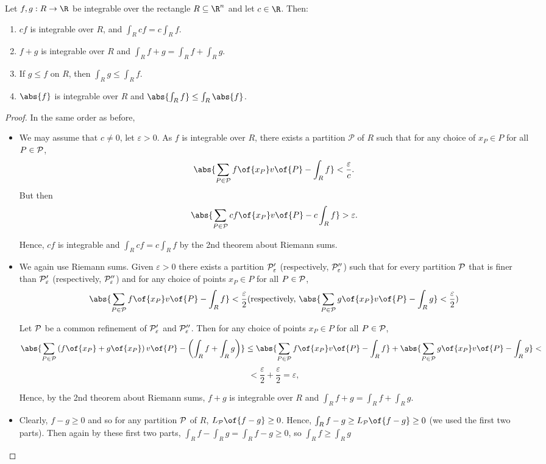 \begin{theorem}[*1]
    Let $f,g: R \to \R$ be integrable over the rectangle $R \subseteq \R^n$ and let $c \in \R$. Then:
    \begin{enumerate}
        \item $cf$ is integrable over $R$, and $\int_R cf = c\int_R f$.
        \item $f + g$ is integrable over $R$ and $\int_R f + g = \int_R f + \int_R g$.
        \item If $g \leq f$ on $R$, then $\int_R g \leq \int_R f$.
        \item $\abs{f}$ is integrable over $R$ and $\abs{\int_R f} \leq \int_R \abs{f}$.
    \end{enumerate}
\end{theorem}
\begin{proof}
    In the same order as before,
    \begin{itemize}
        \item We may assume that $c \neq 0$, let $\varepsilon > 0$. As $f$ is integrable over $R$, there exists a partition $\mathcal{P}$ of $R$ such that for any choice of $x_P \in P$ for all $P \in \cal{P}$, \[\abs{\sum_{P \in \cal{P}} f\of{x_P} v\of{P} - \int_R f} < \frac{\varepsilon}{c}.\] But then \[\abs{\sum_{P \in \cal{P}} cf\of{x_P} v\of{P} - c\int_R f} > \varepsilon.\]
        
        Hence, $cf$ is integrable and $\int_R cf = c\int_R f$ by the 2nd theorem about Riemann sums.

        \item We again use Riemann sums. Given $\varepsilon > 0$ there exists a partition $\cal{P}_\varepsilon'$ (respectively, $\cal{P}_\varepsilon''$) such that for every partition $\cal{P}$ that is finer than $\cal{P}_\varepsilon'$ (respectively, $\cal{P}_\varepsilon''$) and for any choice of points $x_P \in P$ for all $P \in \cal{P}$,
        \[\abs{\sum_{P \in \cal{P}} f\of{x_P} v\of{P} - \int_R f} < \frac{\varepsilon}{2} \text{(respectively, } \abs{\sum_{P \in \cal{P}} g\of{x_P} v\of{P} - \int_R g} < \frac{\varepsilon}{2} \text{)}\]

        Let $\cal{P}$ be a common refinement of $\cal{P}_\varepsilon'$ and $\cal{P}_\varepsilon''$. Then for any choice of points $x_P \in P$ for all $P \in \cal{P}$,
        \[\abs{\sum_{P \in \cal{P}} \left(f\of{x_P} + g\of{x_P}\right) v\of{P} - \left(\int_R f + \int_R g\right)} \leq \abs{\sum_{P \in \cal{P}} f\of{x_P} v\of{P} - \int_R f} + \abs{\sum_{P \in \cal{P}} g\of{x_P} v\of{P} - \int_R g} <\]
        \[<  \frac{\varepsilon}{2} + \frac{\varepsilon}{2} = \varepsilon,\]

        Hence, by the 2nd theorem about Riemann sums, $f + g$ is integrable over $R$ and $\int_R f + g = \int_R f + \int_R g$.

        \item Clearly, $f - g \geq 0$ and so for any partition $\cal{P}$ of $R$, $L_{\cal{P}}\of{f-g} \geq 0$. Hence, $\int_R f-g \geq L_{\cal{P}}\of{f-g} \geq 0$ (we used the first two parts). Then again by these first two parts, $\int_R f - \int_R g = \int_R f-g \geq 0$, so $\int_R f \geq \int_R g$
    \end{itemize}
\end{proof}

